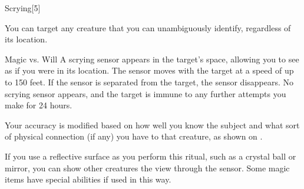 \begin{spellsection}{Scrying}[5]
    \begin{spellheader}
    \end{spellheader}
    \begin{spellcontent}
        \begin{spelltargetinginfo}
        \end{spelltargetinginfo}
        \begin{spelleffects}

            \spellspecial You can target any creature that you can unambiguously identify, regardless of its location.
            \begin{spellattack}{Magic vs. Will}
                \spellsuccess A scrying sensor appears in the target's space, allowing you to see as if you were in its location. The sensor moves with the target at a speed of up to 150 feet. If the sensor is separated from the target, the sensor disappears.
                \spellfailure No scrying sensor appears, and the target is immune to any further attempts you make for 24 hours.

                \spellspecial Your accuracy is modified based on how well you know the subject and what sort of physical connection (if any) you have to that creature, as shown on .
            \end{spellattack}
            \spelldur \durmed \dismissable
        \end{spelleffects}
    \end{spellcontent}
    \begin{spellfooter}
        \spellnotes \sensorspellnotes
        \spellnotes If you use a reflective surface as you perform this ritual, such as a crystal ball or mirror, you can show other creatures the view through the sensor. Some magic items have special abilities if used in this way.
    \end{spellfooter}
\end{spellsection}
